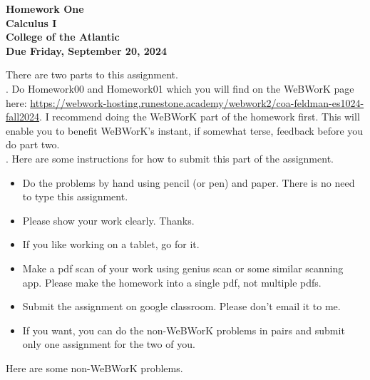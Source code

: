 \documentclass[12pt]{article}
\begin{document}
\pagestyle{empty}
 
\begin{center}
{\LARGE {\bf Homework One}}\\
\bigskip
{\Large {\bf Calculus I}}\\
\bigskip
{\Large {\bf College of the Atlantic}}\\
\bigskip
{ {\bf Due Friday, September 20, 2024}}\\ 
\end{center}
\medskip


\noindent There are two parts to this assignment.\\

.  Do Homework00 and Homework01 which you
will find on the WeBWorK page here:
\url{https://webwork-hosting.runestone.academy/webwork2/coa-feldman-es1024-fall2024}. I 
recommend doing the WeBWorK part of the homework first. This will
enable you to benefit WeBWorK's instant, if somewhat terse, feedback
before you do part two.\\ 


.  Here are some
instructions for how to submit this part of the assignment.
\begin{itemize}
\item Do the problems by hand using pencil (or pen) and paper.
  There is no need to type this assignment.
\item Please show your work clearly. Thanks.
\item If you like working on a tablet, go for it. 
\item Make a pdf scan of your work using genius scan or some
  similar scanning app.  Please make the homework into a single
  pdf, not multiple pdfs.
\item Submit the assignment on google classroom.  Please don't
  email it to me.
\item If you want, you can do the non-WeBWorK problems in pairs and
  submit only one assignment for the two of you. \\
\end{itemize}

\noindent Here are some non-WeBWorK problems.
\end{document}
